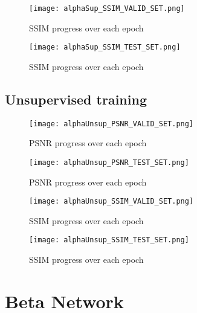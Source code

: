 \begin{figure}[tb] 
\centering 
\texttt{[image: alphaSup\_SSIM\_VALID\_SET.png]} 
\caption[SSIM validation progress during training of supervised alpha network]{SSIM progress over each epoch}
\label{fig:alphaSupValidSSIM} 
\end{figure}  

\begin{figure}[tb] 
\centering 
\texttt{[image: alphaSup\_SSIM\_TEST\_SET.png]} 
\caption[SSIM testing progress during training of supervised alpha network]{SSIM progress over each epoch}
\label{fig:alphaSupTestSSIM} 
\end{figure}  


\subsection{Unsupervised training}

\begin{figure}[tb] 
\centering 
\texttt{[image: alphaUnsup\_PSNR\_VALID\_SET.png]} 
\caption[PSNR validation progress during training of supervised alpha network]{PSNR progress over each epoch}
\label{fig:alphaUnsupValidPSNR} 
\end{figure}  

\begin{figure}[tb] 
\centering 
\texttt{[image: alphaUnsup\_PSNR\_TEST\_SET.png]} 
\caption[PSNR testing progress during training of supervised alpha network]{PSNR progress over each epoch}
\label{fig:alphaUnsupTestPSNR} 
\end{figure}  

\begin{figure}[tb] 
\centering 
\texttt{[image: alphaUnsup\_SSIM\_VALID\_SET.png]} 
\caption[SSIM validation progress during training of supervised alpha network]{SSIM progress over each epoch}
\label{fig:alphaUnsupValidSSIM} 
\end{figure}  

\begin{figure}[tb] 
\centering 
\texttt{[image: alphaUnsup\_SSIM\_TEST\_SET.png]} 
\caption[SSIM testing progress during training of supervised alpha network]{SSIM progress over each epoch}
\label{fig:alphaUnsupTestSSIM} 
\end{figure}  

\section{Beta Network}

